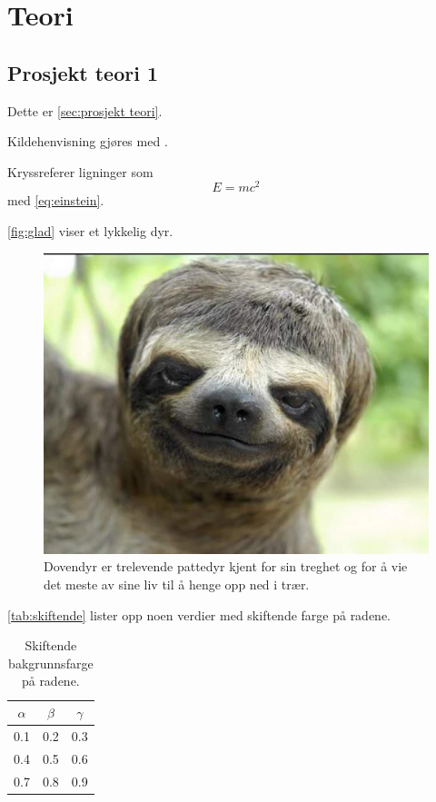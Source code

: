 \section{Teori}\label{sec:Teori}

\subsection{Prosjekt teori 1}\label{sec:prosjekt teori}
Dette er \autoref{sec:prosjekt teori}.

Kildehenvisning gjøres med  \cite[s.~100]{Sakurai}.

Kryssreferer ligninger som
\begin{equation}\label{eq:einstein}
    E = m c^2
\end{equation}
med \cref{eq:einstein}.

\autoref{fig:glad} viser et lykkelig dyr. 
\begin{figure}[H]
\begin{center}\includegraphics[scale=0.5]{Figures/Funny-Animal-Face.jpg}
\end{center}
\caption{Dovendyr er trelevende pattedyr kjent for sin treghet og for å vie det meste av sine liv til å henge opp ned i trær.}
\label{fig:glad}
\end{figure}

\autoref{tab:skiftende} lister opp noen verdier med skiftende farge på radene. 
\begin{table}[H]
\caption{Skiftende bakgrunnsfarge på radene.}
\centering
{}
\begin{tabular}{ccc}
\hline
\hline 
$\alpha$ & $\beta$ & $\gamma$
\\
\hline 
\hline 
0.1 & 0.2 & 0.3
\\
0.4 & 0.5 & 0.6
\\
0.7 & 0.8 & 0.9
\\
\hline
\end{tabular}
\label{tab:skiftende}
\end{table}
